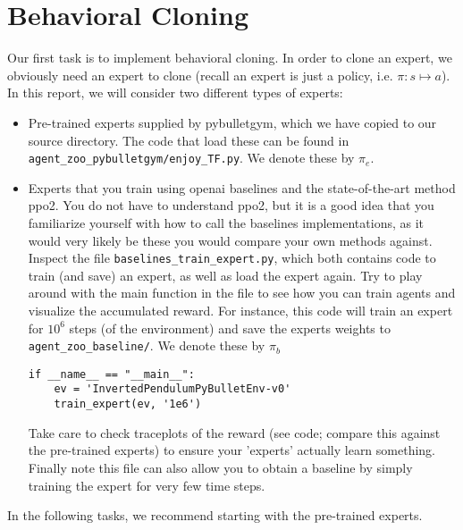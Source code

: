 \documentclass[12pt,twoside]{article}
\begin{document}
\section{Behavioral Cloning} \label{bc}
Our first task is to implement behavioral cloning. In order to clone an expert, we obviously need an expert to clone (recall an expert is just a policy, i.e. $\pi : s \mapsto a$). In this report, we will consider two different types of experts: 
\begin{itemize}
	\item Pre-trained experts supplied by pybulletgym, which we have copied to our source directory. The code that load these can be found in  \texttt{agent_zoo_pybulletgym/enjoy_TF.py}. We denote these by $\pi_e$.
\item Experts that you train using openai baselines and the state-of-the-art method ppo2. You do not have to understand ppo2, but it is a good idea that you familiarize yourself with how to call the baselines implementations, as it would  very likely be these you would compare your own methods against. Inspect the file \texttt{baselines_train_expert.py}, which both contains code to train (and save) an expert, as well as load the expert again. Try to play around with the main function in the file to see how you can train agents and visualize the accumulated reward. For instance, this code will train an expert for $10^6$ steps (of the environment) and save the experts weights to \texttt{agent_zoo_baseline/}. We denote these by $\pi_b$
\begin{verbatim}
if __name__ == "__main__":
	ev = 'InvertedPendulumPyBulletEnv-v0'
	train_expert(ev, '1e6')
\end{verbatim}
Take care to check traceplots of the reward (see code; compare this against the pre-trained experts) to ensure your 'experts' actually learn something. Finally note this file can also allow you to obtain a baseline by simply training the expert for very few time steps. 
\end{itemize}
In the following tasks, we recommend starting with the pre-trained experts.
\end{document}
